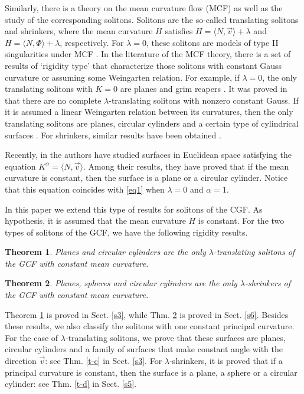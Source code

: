 \documentclass[a4paper,12pt]{amsart}
\newtheorem{theorem}{Theorem}[section]
\theoremstyle{definition}
\begin{document}
Similarly,  there is   a theory on the mean curvature flow (MCF) as well as the study of the corresponding solitons. Solitons are  the so-called translating  solitons and shrinkers, where the mean curvature $H$ satisfies  $H=\langle N,\vec{v}\rangle+\lambda$ and $H=\langle N,\Phi\rangle+\lambda$, respectively. For $\lambda=0$, these solitons are models of  type II singularities under MCF  \cite{hu}. In the literature of the  MCF theory, there is a set of results of `rigidity type' that characterize those solitons with constant Gauss curvature or assuming some Weingarten relation. For example, if $\lambda=0$, the only translating solitons with  $K=0$ are planes and  grim reapers \cite{ms}. It was proved in  \cite{li}  that there are no complete $\lambda$-translating solitons with nonzero constant Gauss.   If it is assumed a linear Weingarten relation between its curvatures,  then the only translating solitons are planes, circular cylinders and   a  certain type of cylindrical surfaces \cite{flly}. For  shrinkers, similar results have been obtained \cite{co,fu2,yf,yfl}.


Recently, in \cite{fl} the authors have studied surfaces in Euclidean space satisfying the equation $K^\alpha=\langle N,\vec{v}\rangle$. Among their results, they have proved that if the mean curvature is constant, then the surface is a plane or a circular cylinder. Notice that this equation coincides with \eqref{eq1} when $\lambda=0$ and $\alpha=1$. 

In this paper we extend this type of results for solitons of the CGF. As hypothesis, it is  assumed that the mean curvature $H$ is constant.   For the two types of solitons of the GCF, we have the following rigidity results.

  
\begin{theorem}\label{t1}
Planes and circular cylinders are the only   $\lambda$-translating solitons of the GCF with constant mean curvature.
 \end{theorem}

\begin{theorem}\label{t2}
Planes, spheres and circular cylinders are the only  $\lambda$-shrinkers of the GCF  with constant mean curvature. \end{theorem}



Theorem \ref{t1} is proved in Sect.   \ref{s3}, while Thm. \ref{t2} is proved in Sect. \ref{s6}. Besides these results, we also classify the solitons with one constant principal curvature.  For the case of $\lambda$-translating solitons, we prove that these surfaces are planes, circular cylinders and a family of surfaces that make constant angle with the direction $\vec{v}$: see Thm. \ref{t-c} in Sect. \ref{s3}. For $\lambda$-shrinkers, it is proved that if a principal curvature is constant, then the surface is a plane, a sphere or a circular cylinder: see Thm. \ref{t-d} in Sect. \ref{s5}.  
\end{document}
